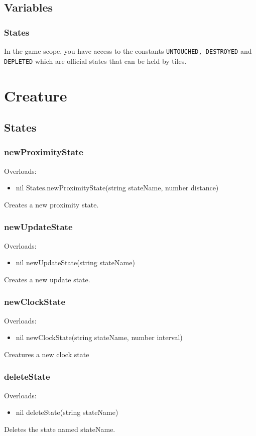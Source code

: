 \documentclass{book}
\newenvironment{ulist}
	{\begin{itemize}
			\itemsep0em}
	{\end{itemize}}
\begin{document}
\subsection{Variables}
\subsubsection{States}
In the game scope, you have access to the constants \texttt{UNTOUCHED, DESTROYED} and \texttt{DEPLETED} which are official states that can be held by tiles.

\section{Creature}
\subsection{States}
\subsubsection{newProximityState}
Overloads:
\begin{ulist}
	\item nil States.newProximityState(string stateName, number distance)
\end{ulist}
Creates a new proximity state.

\subsubsection{newUpdateState}
Overloads:
\begin{ulist}
	\item nil newUpdateState(string stateName)
\end{ulist}
Creates a new update state.

\subsubsection{newClockState}
Overloads:
\begin{ulist}
	\item nil newClockState(string stateName, number interval)
\end{ulist}
Creatures a new clock state

\subsubsection{deleteState}
Overloads:
\begin{ulist}
	\item nil deleteState(string stateName)
\end{ulist}
Deletes the state named stateName.
\end{document}
